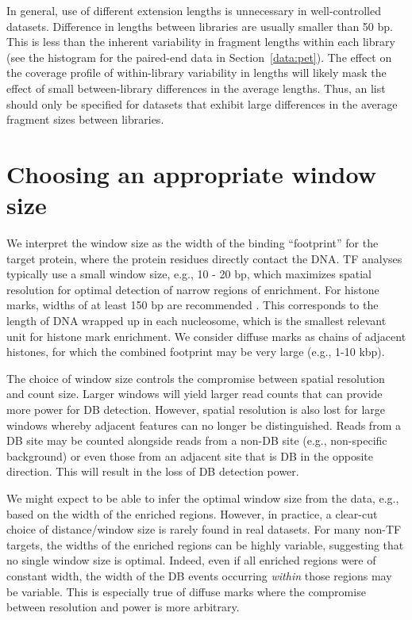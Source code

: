 \documentclass{report}\usepackage[]{graphicx}\usepackage[usenames,dvipsnames]{color}
\begin{document}
In general, use of different extension lengths is unnecessary in well-controlled datasets.
Difference in lengths between libraries are usually smaller than 50 bp.
This is less than the inherent variability in fragment lengths within each library (see the histogram for the paired-end data in Section~\ref{data:pet}).
The effect on the coverage profile of within-library variability in lengths will likely mask the effect of small between-library differences in the average lengths.
Thus, an  list should only be specified for datasets that exhibit large differences in the average fragment sizes between libraries.

\section{Choosing an appropriate window size}
\label{sec:windowsize}

We interpret the window size as the width of the binding ``footprint'' for the target protein, where the protein residues directly contact the DNA.
TF analyses typically use a small window size, e.g., 10 - 20 bp, which maximizes spatial resolution for optimal detection of narrow regions of enrichment. 
For histone marks, widths of at least 150 bp are recommended \cite{humburg2011}. 
This corresponds to the length of DNA wrapped up in each nucleosome, which is the smallest relevant unit for histone mark enrichment. 
We consider diffuse marks as chains of adjacent histones, for which the combined footprint may be very large (e.g., 1-10 kbp).

The choice of window size controls the compromise between spatial resolution and count size. 
Larger windows will yield larger read counts that can provide more power for DB detection. 
However, spatial resolution is also lost for large windows whereby adjacent features can no longer be distinguished. 
Reads from a DB site may be counted alongside reads from a non-DB site (e.g., non-specific background) or even those from an adjacent site that is DB in the opposite direction. 
This will result in the loss of DB detection power.

We might expect to be able to infer the optimal window size from the data, e.g., based on the width of the enriched regions.
However, in practice, a clear-cut choice of distance/window size is rarely found in real datasets.
For many non-TF targets, the widths of the enriched regions can be highly variable, suggesting that no single window size is optimal.
Indeed, even if all enriched regions were of constant width, the width of the DB events occurring \textit{within} those regions may be variable.
This is especially true of diffuse marks where the compromise between resolution and power is more arbitrary. 
\end{document}
